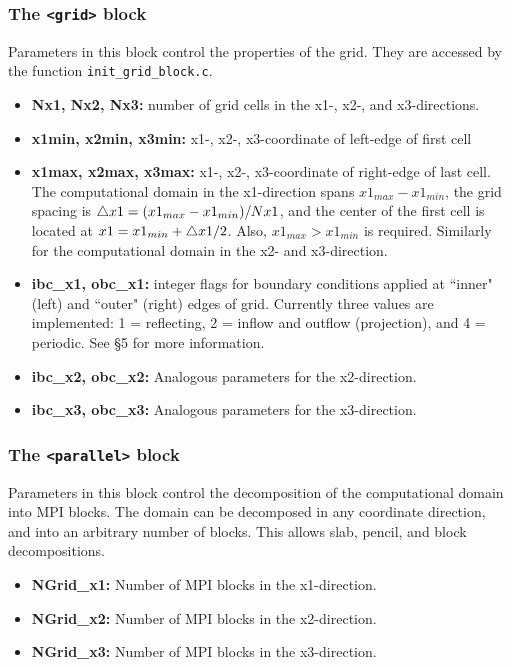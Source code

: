 \subsubsection{The {\tt <grid>} block}

Parameters in this block control the properties of the grid. 
They are accessed by the function {\tt init\_grid\_block.c}.
\begin{itemize}
\item {\bf Nx1, Nx2, Nx3:} number of grid cells in the x1-, x2-, and x3-directions.
\item {\bf x1min, x2min, x3min:} x1-, x2-, x3-coordinate of left-edge of first cell
\item {\bf x1max, x2max, x3max:} x1-, x2-, x3-coordinate of right-edge of last cell.
The computational domain in the x1-direction spans $x1_{max}-x1_{min}$, the grid
spacing is $\bigtriangleup x1=(x1_{max}-x1_{min})/Nx1$, and the center of the
first cell is located at $x1=x1_{min} + \bigtriangleup x1/2$. Also, $x1_{max} >
x1_{min}$ is required.  Similarly for the computational domain in the 
x2- and x3-direction.
\item {\bf ibc\_x1, obc\_x1:} integer flags for boundary conditions applied
at ``inner" (left) and ``outer" (right) edges of grid.  Currently three
values are implemented: 1 = reflecting, 2 = inflow and outflow (projection), 
and 4 = periodic.  See \S 5 for more information.
\item {\bf ibc\_x2, obc\_x2:} Analogous parameters for the x2-direction.
\item {\bf ibc\_x3, obc\_x3:} Analogous parameters for the x3-direction.
\end{itemize}

\subsubsection{The {\tt <parallel>} block}

Parameters in this block control the decomposition of the computational
domain into MPI blocks.  The domain can be decomposed in any coordinate
direction, and into an arbitrary number of blocks.  This allows slab, pencil,
and block decompositions.
\begin{itemize}
\item {\bf NGrid\_x1:} Number of MPI blocks in the x1-direction.
\item {\bf NGrid\_x2:} Number of MPI blocks in the x2-direction.
\item {\bf NGrid\_x3:} Number of MPI blocks in the x3-direction.
\end{itemize}

